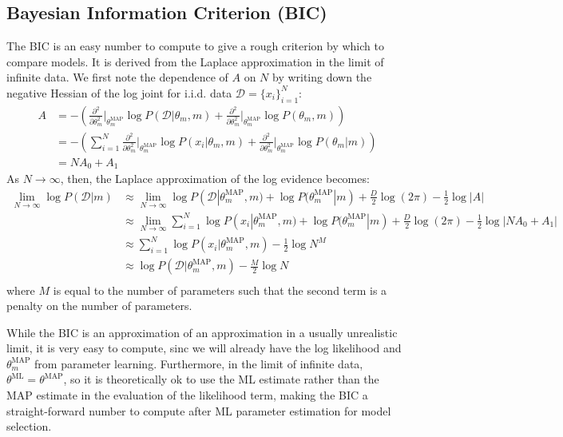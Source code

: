 \documentclass[a4paper]{article}
\begin{document}
\subsection{Bayesian Information Criterion (BIC)}
The BIC is an easy number to compute to give a rough criterion by which to compare models. It is derived from the Laplace approximation in the limit of infinite data. We first note the dependence of $A$ on $N$ by writing down the negative Hessian of the log joint for i.i.d. data $\mathcal{D} = \{x_i\}_{i=1}^N$:
\begin{align*}
A &= - \left( \frac{\partial^2}{\partial \theta_m^2}\Bigr|_{\theta_m^\textrm{MAP}}\log P(\mathcal{D}|\theta_m,m) + \frac{\partial^2}{\partial \theta_m^2}\Bigr|_{\theta_m^\textrm{MAP}}\log P(\theta_m,m) \right) \\
&= -\left( \sum_{i=1}^N \frac{\partial^2}{\partial \theta_m^2}\Bigr|_{\theta_m^\textrm{MAP}}\log P(x_i|\theta_m, m) + \frac{\partial^2}{\partial \theta_m^2}\Bigr|_{\theta_m^\textrm{MAP}}\log P(\theta_m| m) \right) \\
&= NA_0 + A_1
\end{align*}
As $N \rightarrow \infty$, then, the Laplace approximation of the log evidence becomes:
\begin{align*}
\underset{N\rightarrow \infty}{\lim} \log P(\mathcal{D}|m) &\approx \underset{N\rightarrow \infty}{\lim} \log P(\mathcal{D}|\theta_m^\textrm{MAP}, m) + \log P(\theta_m^\textrm{MAP}| m) + \frac{D}{2}\log(2\pi) - \frac{1}{2} \log |A| \\
&\approx \underset{N\rightarrow \infty}{\lim} \sum_{i=1}^N \log P(x_i|\theta_m^\textrm{MAP}, m) + \log P(\theta_m^\textrm{MAP}| m) + \frac{D}{2}\log(2\pi) - \frac{1}{2} \log |NA_0 + A_1| \\
&\approx \sum_{i=1}^N \log P(x_i|\theta_m^\textrm{MAP}, m) - \frac{1}{2} \log N^M \\
&\approx \log P(\mathcal{D}|\theta_m^\textrm{MAP}, m) - \frac{M}{2} \log N \\
\end{align*}
where $M$ is equal to the number of parameters such that the second term is a penalty on the number of parameters. 

While the BIC is an approximation of an approximation in a usually unrealistic limit, it is very easy to compute, sinc we will already have the log likelihood and $\theta_m^\textrm{MAP}$ from parameter learning. Furthermore, in the limit of infinite data, $\theta^\textrm{ML} = \theta^\textrm{MAP}$, so it is theoretically ok to use the ML estimate rather than the MAP estimate in the evaluation of the likelihood term, making the BIC a straight-forward number to compute after ML parameter estimation for model selection.
\end{document}
